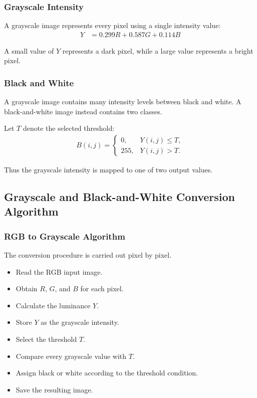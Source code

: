 \subsubsection{Grayscale Intensity}

A grayscale image represents every pixel using a single intensity
value:
\begin{align}
Y&=0.299R+0.587G+0.114B\label{eq:app_grayscale_y}
\end{align}

A small value of $Y$ represents a dark pixel, while a large value
represents a bright pixel.

\subsubsection{Black and White}

A grayscale image contains many intensity levels between black and
white. A black-and-white image instead contains two classes.

Let $T$ denote the selected threshold:
\begin{align}
B(i,j)=
\begin{cases}
0, & Y(i,j)\leq T,\\
255, & Y(i,j)>T.
\end{cases}\label{eq:app_bw_threshold}
\end{align}

Thus the grayscale intensity is mapped to one of two output values.

\subsection{Grayscale and Black-and-White Conversion Algorithm}

\subsubsection{RGB to Grayscale Algorithm}

The conversion procedure is carried out pixel by pixel.

\begin{itemize}[itemsep=2pt, topsep=4pt, leftmargin=2em]
\item Read the RGB input image.
\item Obtain $R$, $G$, and $B$ for each pixel.
\item Calculate the luminance $Y$.
\item Store $Y$ as the grayscale intensity.
\item Select the threshold $T$.
\item Compare every grayscale value with $T$.
\item Assign black or white according to the threshold condition.
\item Save the resulting image.
\end{itemize}

